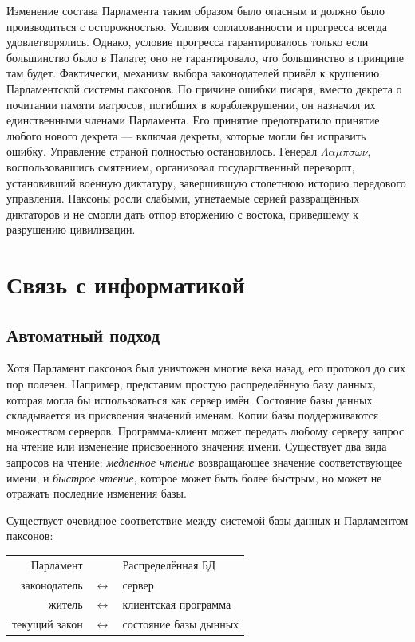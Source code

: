 \documentclass[12pt, a4paper]{article} %
\begin{document}
Изменение состава Парламента таким образом было опасным и должно было производиться с осторожностью. Условия согласованности и прогресса всегда удовлетворялись. Однако, условие прогресса гарантировалось только если большинство было в Палате; оно не гарантировало, что большинство  в принципе там будет. Фактически, механизм выбора законодателей привёл к крушению Парламентской системы паксонов. По причине ошибки писаря, вместо декрета о почитании памяти матросов, погибших в кораблекрушении, он назначил их единственными членами Парламента. Его принятие предотвратило принятие любого нового декрета --- включая декреты, которые могли бы исправить ошибку. Управление страной полностью остановилось. Генерал $\Lambda\alpha\mu\pi\sigma\omega\nu$, воспользовавшись смятением, организовал государственный переворот, установивший военную диктатуру, завершившую столетнюю историю передового управления. Паксоны росли слабыми, угнетаемые серией развращённых диктаторов и не смогли дать отпор вторжению с востока, приведшему к разрушению цивилизации.

\newpage
\section{Связь с информатикой}\label{sec:csconnection}

\subsection{Автоматный подход}

Хотя Парламент паксонов был уничтожен многие века назад, его протокол до сих пор полезен. Например, представим простую распределённую базу данных, которая могла бы использоваться как сервер имён. Состояние базы данных складывается из присвоения значений именам. Копии базы поддерживаются множеством серверов. Программа-клиент может передать любому серверу запрос на чтение или изменение присвоенного значения имени. Существует два вида запросов на чтение: \textit{медленное чтение} возвращающее значение соответствующее имени, и \textit{быстрое чтение}, которое может быть более быстрым, но может не отражать последние изменения базы.

Существует очевидное соответствие между системой базы данных и Парламентом паксонов:
\begin{table}[h]
\begin{center}
\begin{tabular}{rcl}
    Парламент&&Распределённая БД\\
    законодатель&$\leftrightarrow$&сервер\\
    житель&$\leftrightarrow$&клиентская программа\\
    текущий закон&$\leftrightarrow$&состояние базы дынных\\
\end{tabular}
\end{center}
\end{table}
\end{document}
